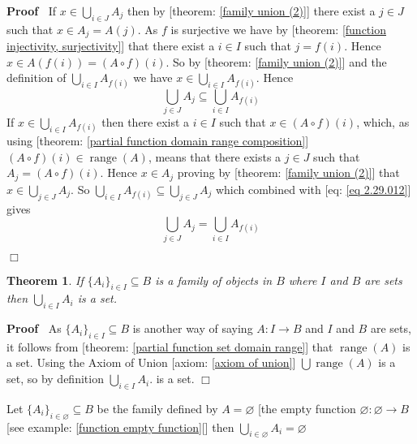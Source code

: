 \documentclass{book}
\newcommand{\tmop}[1]{\ensuremath{\operatorname{#1}}}
\newenvironment{proof}{\noindent\textbf{Proof\ }}{\hspace*{\fill}$\Box$\medskip}
\newtheorem{theorem}{Theorem}
\begin{document}
\begin{proof}
  If $x \in \bigcup_{i \in J} A_j$ then by [theorem: \ref{family union (2)}]
  there exist a $j \in J$ such that $x \in A_j = A (j)$. As $f$ is surjective
  we have by [theorem: \ref{function injectivity, surjectivity}] that there
  exist a $i \in I$ such that $j = f (i)$. Hence $x \in A (f (i)) = (A \circ
  f) (i)$. So by [theorem: \ref{family union (2)}] and the definition of
  $\bigcup_{i \in I} A_{f (i)}$ we have $x \in \bigcup_{i \in I} A_{f (i)}$.
  Hence
  \begin{equation}
    \label{eq 2.29.012} \bigcup_{j \in J} A_j \subseteq \bigcup_{i \in I} A_{f
    (i)}
  \end{equation}
  If $x \in \bigcup_{i \in I} A_{f (i)}$ then there exist a $i \in I$ such
  that $x \in (A \circ f) (i)$, which, as using [theorem: \ref{partial
  function domain range composition}] \ $(A \circ f) (i) \in \tmop{range}
  (A)$, means that there exists a $j \in J$ such that $A_j = (A \circ f) (i)$.
  Hence $x \in A_j$ proving by [theorem: \ref{family union (2)}] that $x \in
  \bigcup_{j \in J} A_j$. So $\bigcup_{i \in I} A_{f (i)} \subseteq \bigcup_{j
  \in J} A_j$ which combined with [eq: \ref{eq 2.29.012}] gives
  \[ \bigcup_{j \in J} A_j = \bigcup_{i \in I} A_{f (i)} \]
  
\end{proof}

\begin{theorem}
  \label{family union condition set}If $\{ A_i \}_{i \in I} \subseteq B$ is a
  family of objects in $B$ where $I$ and $B$ are sets then $\bigcup_{i \in I}
  A_i$ is a set.
\end{theorem}

\begin{proof}
  As $\{ A_i \}_{i \in I} \subseteq B$ is another way of saying $A : I
  \rightarrow B$ and $I$ and $B$ are sets, it follows from [theorem:
  \ref{partial function set domain range}] that $\tmop{range} (A)$ is a set.
  Using the Axiom of Union [axiom: \ref{axiom of union}] $\bigcup \tmop{range}
  (A)$ is a set, so by definition $\bigcup_{i \in I} A_i$. is a set.
\end{proof}

\begin{example}
  \label{family union of a empty set}Let $\{ A_i \}_{i \in \varnothing}
  \subseteq B$ be the family defined by $A = \varnothing$ [the empty function
  $\varnothing : \varnothing \rightarrow B$ [see example: \ref{function empty
  function}[] then $\bigcup_{i \in \varnothing} A_i = \varnothing$
\end{example}
\end{document}

